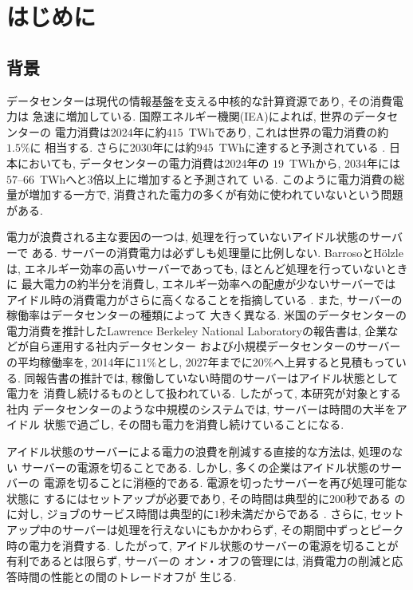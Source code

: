 \documentclass[a4paper, 11pt, dvipdfmx]{jsreport}
\begin{document}
\pagestyle{plain}
\tableofcontents
\listoffigures

\pagebreak \setcounter{page}{1}

\chapter{はじめに}
\label{sec:introduction}

\section{背景}
\label{sec:background}

データセンターは現代の情報基盤を支える中核的な計算資源であり, その消費電力は
急速に増加している. 国際エネルギー機関(IEA)によれば, 世界のデータセンターの
電力消費は2024年に約$415$~TWhであり, これは世界の電力消費の約$1. 5\%$に
相当する. さらに2030年には約$945$~TWhに達すると予測されている
\cite{IEA2025}. 日本においても, データセンターの電力消費は2024年の
$19$~TWhから, 2034年には$57$--$66$~TWhへと3倍以上に増加すると予測されて
いる\cite{WoodMackenzie2025}. このように電力消費の総量が増加する一方で, 
消費された電力の多くが有効に使われていないという問題がある. 

電力が浪費される主な要因の一つは, 処理を行っていないアイドル状態のサーバーで
ある. サーバーの消費電力は必ずしも処理量に比例しない. BarrosoとH\"{o}lzleは, 
エネルギー効率の高いサーバーであっても, ほとんど処理を行っていないときに
最大電力の約半分を消費し, エネルギー効率への配慮が少ないサーバーでは
アイドル時の消費電力がさらに高くなることを指摘している
\cite{BarrosoHolzle2007}. また, サーバーの稼働率はデータセンターの種類によって
大きく異なる. 米国のデータセンターの電力消費を推計したLawrence Berkeley
National Laboratoryの報告書は, 企業などが自ら運用する社内データセンター
および小規模データセンターのサーバーの平均稼働率を, 2014年に$11\%$とし, 
2027年までに$20\%$へ上昇すると見積もっている\cite{Shehabi2024}. 
同報告書の推計では, 稼働していない時間のサーバーはアイドル状態として電力を
消費し続けるものとして扱われている. したがって, 本研究が対象とする社内
データセンターのような中規模のシステムでは, サーバーは時間の大半をアイドル
状態で過ごし, その間も電力を消費し続けていることになる. 

アイドル状態のサーバーによる電力の浪費を削減する直接的な方法は, 処理のない
サーバーの電源を切ることである. しかし, 多くの企業はアイドル状態のサーバーの
電源を切ることに消極的である. 電源を切ったサーバーを再び処理可能な状態に
するにはセットアップが必要であり, その時間は典型的に$200$秒である
のに対し, ジョブのサービス時間は典型的に$1$秒未満だからである
\cite{Gandhi2014}. さらに, セットアップ中のサーバーは処理を行えないにもかかわらず, 
その期間中ずっとピーク時の電力を消費する\cite{Gandhi2014}. したがって, 
アイドル状態のサーバーの電源を切ることが有利であるとは限らず, サーバーの
オン・オフの管理には, 消費電力の削減と応答時間の性能との間のトレードオフが
生じる. 
\end{document}

